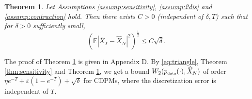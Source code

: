 \documentclass[letterpaper,11pt,reqno]{amsart}
\newtheorem{theorem}{Theorem}[section]
\numberwithin{equation}{section}
\begin{document}
\begin{theorem}
\label{thm:globalerr}
Let Assumptions \ref{assump:sensitivity}, \ref{assump:2dis} and \ref{assump:contraction} hold.
Then there exists $C > 0$ (independent of $\delta, T$) such that
for $\delta >0$ sufficiently small,
\begin{equation}
\label{eq:globalerr}
\left(\mathbb{E}|\overline{X}_T - \widehat{X}_N|^2 \right)^{\frac{1}{2}} \le C \sqrt{\delta}.
\end{equation}
\end{theorem}

\quad The proof of Theorem \ref{thm:globalerr} is given in Appendix D. 
By \eqref{eq:triangle}, Theorem \ref{thm:sensitivity} and 
Theorem \ref{thm:globalerr}, 
we get a bound 
$W_2(p_{\tiny \mbox{data}}(\cdot), \widehat{X}_N)$
of order 
$\eta e^{-T} + \varepsilon (1 - e^{-T}) + \sqrt{\delta}$
for CDPMs,
where the discretization error is independent of $T$.


\end{document}

